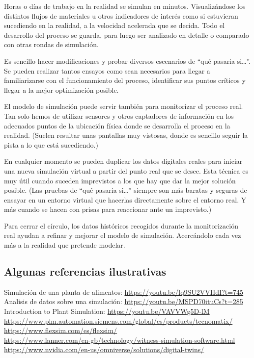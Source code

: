 \documentclass[spanish,12pt,a4paper,final,oneside]{book}
\begin{document}
Horas o días de trabajo en la realidad se simulan en minutos. Visualizándose los distintos flujos de materiales u otros indicadores de interés como si estuvieran sucediendo en la realidad, a la velocidad acelerada que se decida. Todo el desarrollo del proceso se guarda, para luego ser analizado en detalle o comparado con otras rondas de simulación. 

Es sencillo hacer modificaciones y probar diversos escenarios de ``qué pasaria si\ldots''. Se pueden realizar tantos ensayos como sean necesarios para llegar a familiarizarse con el funcionamiento del proceso, identificar sus puntos críticos y llegar a la mejor optimización posible.

El modelo de simulación puede servir también para monitorizar el proceso real. Tan solo hemos de utilizar sensores y otros captadores de información en los adecuados puntos de la ubicación física donde se desarrolla el proceso en la realidad. (Suelen resultar unas pantallas muy vistosas, donde es sencillo seguir la pista a lo que está sucediendo.)

En cualquier momento se pueden duplicar los datos digitales reales para iniciar una nueva simulación virtual a partir del punto real que se desee. Esta técnica es muy útil cuando suceden imprevistos a los que hay que dar la mejor solución posible. (Las pruebas de ``qué pasaria si\ldots'' siempre son más baratas y seguras de ensayar en un entorno virtual que hacerlas directamente sobre el entorno real. Y más cuando se hacen con prisas para reaccionar ante un imprevisto.)

Para cerrar el círculo, los datos históricos recogidos durante la monitorización real ayudan a refinar y mejorar el modelo de simulación. Acercándolo cada vez más a la realidad que pretende modelar.


\subsection*{Algunas referencias ilustrativas}
Simulación de una planta de alimentos: \url{https://youtu.be/lq9SU2VVHdI?t=745}
\\Analisis de datos sobre una simulación: \url{https://youtu.be/MSPD70ituCs?t=285}
\\Introduction to Plant Simulation: \url{https://youtu.be/VAVVWg5D-lM}
\\ \url{https://www.plm.automation.siemens.com/global/es/products/tecnomatix/}
\\ \url{https://www.flexsim.com/es/flexsim/}
\\ \url{https://www.lanner.com/en-gb/technology/witness-simulation-software.html}
\\ \url{https://www.nvidia.com/en-us/omniverse/solutions/digital-twins/}
\end{document}
